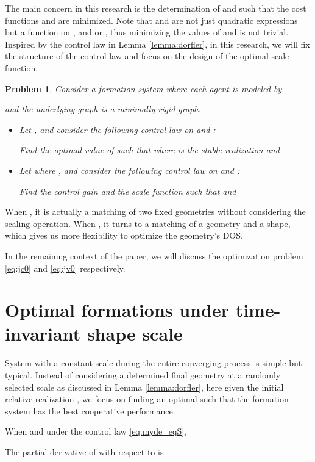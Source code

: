 \documentclass[times]{rncauth}
\newtheorem{prob}{Problem}[section]
\begin{document}
The main concern in this research is the determination of  and
  such that the cost functions  and 
are minimized. Note that  and  are not just quadratic
expressions but a function on ,  and  or
, thus minimizing the values of  and
 is not trivial. Inspired by the control law in Lemma
\ref{lemma:dorfler}, in this research, we will fix the structure of
the control law and focus on the design of the optimal scale
function.
\begin{prob}\label{prob:general}
  Consider a formation system where each agent is modeled by

and the underlying graph  is a minimally rigid graph.
\begin{itemize}
\item Let , and consider the following control law on    and :

Find the optimal value of  such that  where
 is the stable realization and

\item Let  where , and consider the following control
law on   and :

Find the control gain  and the scale function  such that
 and

\end{itemize}
\end{prob}

When , it is actually a matching of two fixed geometries without considering the scaling operation. When , it turns to a matching of a geometry and a  shape, which gives us more flexibility to optimize  the geometry's DOS.


In the remaining context of the paper, we will discuss the
optimization problem \eqref{eq:jc0} and \eqref{eq:jv0} respectively.

\section{Optimal formations under time-invariant shape
scale}\label{sec:inva} System with a constant scale  during the
entire converging process is simple but typical. Instead of
considering a determined final geometry at a randomly selected scale
as discussed in Lemma \ref{lemma:dorfler}, here given the initial
relative realization , we focus on finding an optimal 
 such that the formation system has the best cooperative performance.


When  and under the control law \eqref{eq:myde_eqS},

The partial derivative of  with respect to  is
\end{document}
